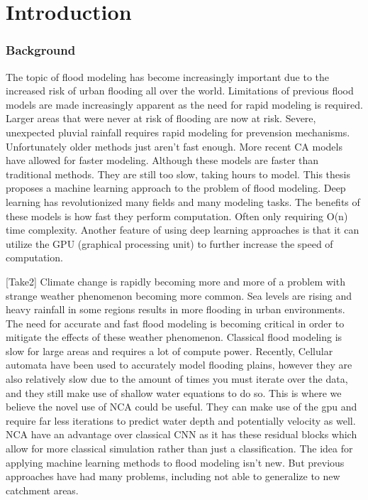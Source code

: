 
\chapter{Introduction} %
\label{Chapter1} %

\subsection{Background}
The topic of flood modeling has become increasingly important due to the increased risk of urban flooding all over the world. Limitations of previous flood models are made increasingly apparent as the need for rapid modeling is required. Larger areas that were never at risk of flooding are now at risk. Severe, unexpected pluvial rainfall requires rapid modeling for prevension mechanisms. Unfortunately older methods just aren't fast enough. More recent CA models have allowed for faster modeling. Although these models are faster than traditional methods. They are still too slow, taking hours to model. This thesis proposes a machine learning approach to the problem of flood modeling. Deep learning has revolutionized many fields and many modeling tasks. The benefits of these models is how fast they perform computation. Often only requiring O(n) time complexity. Another feature of using deep learning approaches is that it can utilize the GPU (graphical processing unit) to further increase the speed of computation.

[Take2]
Climate change is rapidly becoming more and more of a problem with strange weather phenomenon becoming more common. Sea levels are rising and heavy rainfall in some regions results in more flooding in urban environments. The need for accurate and fast flood modeling is becoming critical in order to mitigate the effects of these weather phenomenon. Classical flood modeling is slow for large areas and requires a lot of compute power. Recently, Cellular automata have been used to accurately model flooding plains, however they are also relatively slow due to the amount of times you must iterate over the data, and they still make use of shallow water equations to do so. This is where we believe the novel use of NCA could be useful. They can make use of the gpu and require far less iterations to predict water depth and potentially velocity as well. NCA have an advantage over classical CNN as it has these residual blocks which allow for more classical simulation rather than just a classification.
The idea for applying machine learning methods to flood modeling isn't new. But previous approaches have had many problems, including not able to generalize to new catchment areas. 

